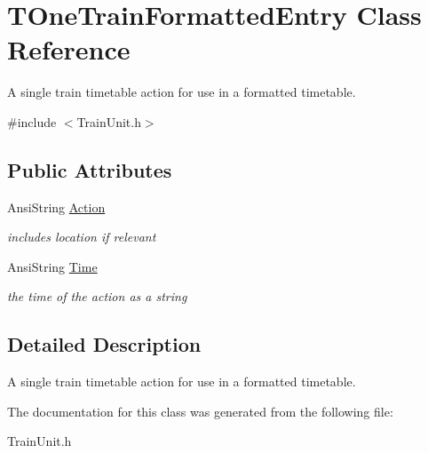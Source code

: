 \hypertarget{class_t_one_train_formatted_entry}{}\section{T\+One\+Train\+Formatted\+Entry Class Reference}
\label{class_t_one_train_formatted_entry}


A single train timetable action for use in a formatted timetable.  




{\ttfamily \#include $<$Train\+Unit.\+h$>$}

\subsection*{Public Attributes}
\begin{DoxyCompactItemize}
\item 
\mbox{\label{class_t_one_train_formatted_entry_aed96f14cc0862be5da673e206090e6d6}} 
Ansi\+String \mbox{\hyperlink{class_t_one_train_formatted_entry_aed96f14cc0862be5da673e206090e6d6}{Action}}
\begin{DoxyCompactList}\small\item\em includes location if relevant \end{DoxyCompactList}\item 
\mbox{\label{class_t_one_train_formatted_entry_a1731ee3ca7f8f0a0e7a5d048737bdeec}} 
Ansi\+String \mbox{\hyperlink{class_t_one_train_formatted_entry_a1731ee3ca7f8f0a0e7a5d048737bdeec}{Time}}
\begin{DoxyCompactList}\small\item\em the time of the action as a string \end{DoxyCompactList}\end{DoxyCompactItemize}


\subsection{Detailed Description}
A single train timetable action for use in a formatted timetable. 

The documentation for this class was generated from the following file\+:\begin{DoxyCompactItemize}
\item 
Train\+Unit.\+h\end{DoxyCompactItemize}
